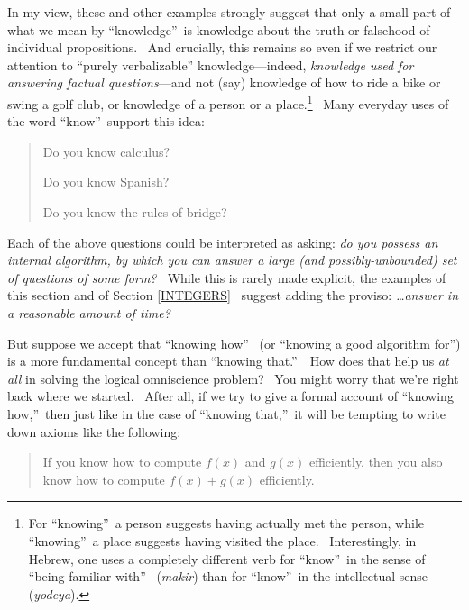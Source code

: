 \documentclass[11pt,onecolumn]{article}%
\begin{document}
In my view, these and other examples strongly suggest that only a small part
of what we mean by \textquotedblleft knowledge\textquotedblright\ is knowledge
about the truth or falsehood of individual propositions. \ And crucially, this
remains so even if we restrict our attention to \textquotedblleft purely
verbalizable\textquotedblright\textit{ }knowledge---indeed, \textit{knowledge
used for answering factual questions}---and not (say) knowledge of how to ride
a bike or swing a golf club, or knowledge of a person or a place.\footnote{For
\textquotedblleft knowing\textquotedblright\ a person suggests having actually
met the person, while \textquotedblleft knowing\textquotedblright\ a place
suggests having visited the place. \ Interestingly, in Hebrew, one uses a
completely different verb for \textquotedblleft know\textquotedblright\ in the
sense of \textquotedblleft being familiar with\textquotedblright%
\ (\textit{makir}) than for \textquotedblleft know\textquotedblright\ in the
intellectual sense (\textit{yodeya}).} \ Many everyday uses of the word
\textquotedblleft know\textquotedblright\ support this idea:

\begin{quotation}
\noindent Do you know calculus?

\noindent Do you know Spanish?

\noindent Do you know the rules of bridge?
\end{quotation}

Each of the above questions could be interpreted as asking: \textit{do you
possess an internal algorithm, by which you can answer a large (and
possibly-unbounded) set of questions of some form? \ }While this is rarely
made explicit, the examples of this section and of Section \ref{INTEGERS}%
\ suggest adding the proviso: \textit{\ldots answer in a reasonable amount of
time?}

But suppose we accept that \textquotedblleft knowing how\textquotedblright%
\ (or \textquotedblleft knowing a good algorithm for\textquotedblright) is a
more fundamental concept than \textquotedblleft knowing
that.\textquotedblright\ \ How does that help us \textit{at all} in solving
the logical omniscience problem? \ You might worry that we're right back where
we started. \ After all, if we try to give a formal account of
\textquotedblleft knowing how,\textquotedblright\ then just like in the case
of \textquotedblleft knowing that,\textquotedblright\ it will be tempting to
write down axioms like the following:

\begin{quotation}
\noindent If you know how to compute $f\left(  x\right)  $ and $g\left(
x\right)  $ efficiently, then you also know how to compute $f\left(  x\right)
+g\left(  x\right)  $ efficiently.
\end{quotation}
\end{document}
